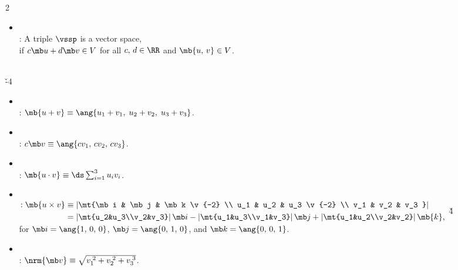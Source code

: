 \documentclass[dvipdfmx,a4paper,titlepage,9pt]{jsarticle}
\begin{document}
\begin{multicols*}{2}
\begin{itemize}[label={-}]
\item{}  \\ 
: A triple $\vssp$ is a vector space, \\
\;\;if $c\mb u+d\mb v\in V$ for all $c,\,d\in\RR$ and $\mb{u,\,v}\in V$. \\
\end{itemize}

 \\
\v{-4}
\begin{itemize}[label={-}]
\item{} \\
: $\mb{u+v}\equiv\ang{u_1+v_1,\;u_2+v_2,\;u_3+v_3}$. \\

\item{} \\
: $c\mb v\equiv\ang{cv_1,\,cv_2,\,cv_3}$. \\

\item{} \\
: $\mb{u\cdot v}\equiv\ds\sum_{i=1}^3 u_iv_i$. \\

\item{} \\
$\begin{aligned}
 \text{:}\;\mb{u\times v}&\equiv\left|\mt{\mb i & \mb j & \mb k \v{-2} \\
                                          u_1   & u_2   & u_3   \v{-2} \\
                                          v_1   & v_2   & v_3          } \right| \\
                         &=\left|\mt{u_2&u_3\\v_2&v_3}\right|\mb i-\left|\mt{u_1&u_3\\v_1&v_3}\right|\mb j+\left|\mt{u_1&u_2\\v_2&v_2}\right|\mb{k}\text{,}
 \end{aligned}$ \v4 \\
\;\;for $\mb i=\ang{1,\,0,\,0}$, $\mb j=\ang{0,\,1,\,0}$, and $\mb k=\ang{0,\,0,\,1}$. \\

\item{} \\
: $\nrm{\mb v}\equiv\sqrt{v_1^{\;2}+v_2^{\;2}+v_3^{\;3}}$. \\
\end{itemize}


\end{multicols*}
\end{document}
